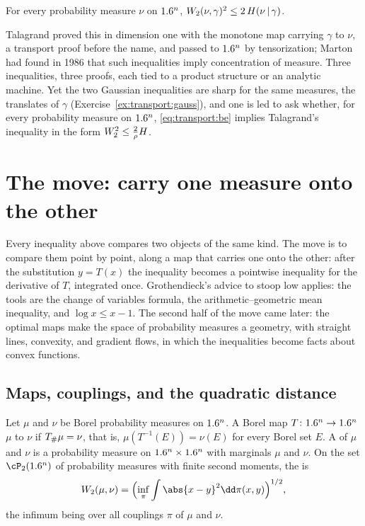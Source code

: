 \begin{refsection}
\begin{theorem}\label{thm:transport:talagrand}
For every probability measure $\nu$ on $1.6^n$, $W_2(\nu,\gamma)^2\le2\,H(\nu\,|\,\gamma)$.
\end{theorem}

Talagrand proved this  in dimension one with the monotone map carrying $\gamma$ to $\nu$, a transport proof before the name, and passed to $1.6^n$ by tensorization; Marton had found in 1986 that such inequalities imply concentration of measure. Three inequalities, three proofs, each tied to a product structure or an analytic machine. Yet the two Gaussian inequalities are sharp for the same measures, the translates of $\gamma$ (Exercise~\ref{ex:transport:gauss}), and one is led to ask whether, for every probability measure on $1.6^n$, \eqref{eq:transport:be} implies Talagrand's inequality in the form $W_2^2\le\frac2\rho H$.

\section{The move: carry one measure onto the other}\label{sec:transport:move}

Every inequality above compares two objects of the same kind. The move is to compare them point by point, along a map that carries one onto the other: after the substitution $y=T(x)$ the inequality becomes a pointwise inequality for the derivative of $T$, integrated once. Grothendieck's advice to stoop low applies: the tools are the change of variables formula, the arithmetic--geometric mean inequality, and $\log x\le x-1$. The second half of the move came later: the optimal maps make the space of probability measures a geometry, with straight lines, convexity, and gradient flows, in which the inequalities become facts about convex functions.

\subsection{Maps, couplings, and the quadratic distance}\label{sec:transport:couplings}

\begin{definition}\label{def:transport:coupling}
Let $\mu$ and $\nu$ be Borel probability measures on $1.6^n$. A Borel map $T\colon1.6^n\to1.6^n$  $\mu$ to $\nu$ if $T_{\#}\mu=\nu$, that is, $\mu(T^{-1}(E))=\nu(E)$ for every Borel set $E$. A  of $\mu$ and $\nu$ is a probability measure on $1.6^n\times1.6^n$ with marginals $\mu$ and $\nu$. On the set $\cP_2(\R^n)$ of probability measures with finite second moments, the  is
\[
\transportW(\mu,\nu)=\Bigl(\inf_{\pi}\int\abs{x-y}^2\dd\pi(x,y)\Bigr)^{1/2},
\]
the infimum being over all couplings $\pi$ of $\mu$ and $\nu$.
\end{definition}


\end{refsection}
